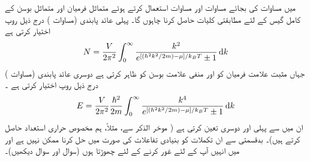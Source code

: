 میں مساوات   کی بجائے مساوات    اور   مساوات   استعمال کرتے ہوئے متماثل فرمیان اور متماثل بوسن کے کامل گیس کے لئے مطابقتی کلیات حاصل کرنا چاہوں گا۔  پہلی  عائد  پابندی  (مساوات  )   درج ذیل روپ اختیار کرتی ہے 
\begin{align}\label{مساوات_متماثل_فرمیان_تعداد_تکمل}
N = \frac{V}{2 \pi^2} \int_0^{\infty} \frac{k^2}{e^{[(h^2 k^2 /2m) - \mu] / k_B T} \pm 1} \dif k
\end{align}
جہاں مثبت علامت فرمیان کو اور منفی علامت بوسن کو ظاہر  کرتی ہے دوسری عائد پابندی  (مساوات   )   درج ذیل روپ اختیار کرتی ہے ۔
\begin{align}\label{مساوات_متماثل_فرمیان_توانائی_تکمل}
E = \frac{V}{2\pi^2} \frac{\hslash^2}{2m} \int_0^{\infty} \frac{k^4}{e^{[(h^2 k^2 /2m) - \mu] / k_B T} \pm 1} \dif k
\end{align}
ان میں سے پہلی   اور دوسری  تعین کرتی ہے   ( موخر الذکر سے، مثلاً،  ہم مخصوص حراری استعداد  حاصل کرتے ہیں)۔  بدقسمتی سے ان  تکملات کو بنیادی تفاعلات کی صورت میں حل کرنا ممکن نہیں ہے اور میں انہیں آپ کے لئے  غور کرنے کے لئے چھوڑتا ہوں (سوال    اور سوال   دیکھیں)۔ 


